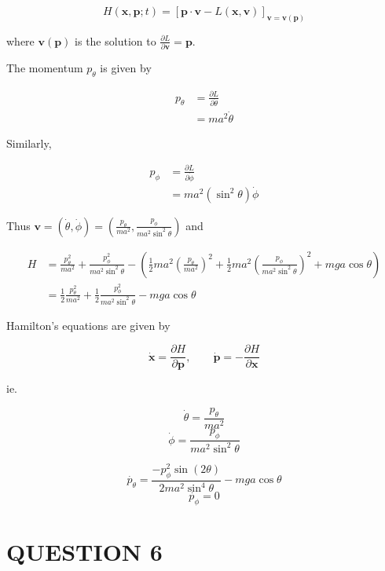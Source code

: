 \documentclass[a4paper]{article}
\begin{document}
\[ H(\mathbf{x},\mathbf{p};t)  = [ \mathbf{p} \cdot \mathbf{v}  - L(\mathbf{x},\mathbf{v}) ]_{\mathbf{v} = \mathbf{v(\mathbf{p})}} \]

where $ \mathbf{v}(\mathbf{p}) $ is the solution to $ \frac{\partial L }{\partial \mathbf{v}} = \mathbf{p} $.

The momentum $ p_{\theta} $ is given by

\begin{align*}
p_{\theta}  & = \frac{\partial  L}{\partial \dot{\theta}} \\
& = m a^{2} \dot{\theta}
\end{align*}

Similarly,

\begin{align*}
p_{\phi} & = \frac{\partial  L}{\partial \dot{\phi}}  \\
& = m a^{2} (\sin^{2} \theta ) \dot{\phi}
\end{align*}

Thus $ \mathbf{v} = (\dot{\theta},\dot{\phi}) = \left(  \frac{p_{\theta}}{ma^{2}},  \frac{p_{\phi}}{ma^{2}\sin^{2}\theta   } \right)   $ and

\begin{align*}
H & = \frac{p_{\theta}^{2}}{ma^{2}} +  \frac{p_{\phi}^{2}}{ma^{2}\sin^{2}\theta } - \left(  \frac{1}{2} m a^{2} \left(  \frac{p_{\theta}}{ma^{2}}\right)^{2}   + \frac{1}{2} m a^{2} \left( \frac{p_{\phi}}{ma^{2}\sin^{2}\theta } \right)^{2}  + mga \cos \theta  \right)    \\
& =  \frac{1}{2} \frac{p_{\theta}^{2}}{ma^{2}} + \frac{1}{2} \frac{p_{\phi}^{2}}{ma^{2}\sin^{2}\theta } -mga \cos \theta
\end{align*}

Hamilton's equations are given by

\[ \dot{\mathbf{x}} = \frac{\partial H }{\partial \mathbf{p}}, \qquad \dot{\mathbf{p}} = - \frac{\partial H }{\partial \mathbf{x}}   \]

ie.

\[ \dot{\theta}  = \frac{p_{\theta}}{ma^{2}} \]
\[ \dot{\phi}  = \frac{p_{\phi}}{ma^{2} \sin^{2} \theta } \]

\[ \dot{p_{\theta}} = \frac{-p_{\phi}^{2} \sin(2\theta) }{2 ma^{2} \sin^{4} \theta}  - mga \cos \theta \]
\[ \dot{p_{\phi}} = 0 \]

\section{QUESTION 6}
\end{document}
